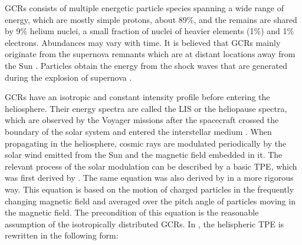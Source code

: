 \acp{GCR} consists of multiple energetic particle species spanning a wide range of energy, which are mostly simple protons, about 89\%, and the remains are shared by 9\% helium nuclei, a small fraction of nuclei of heavier elements (1\%) and 1\% electrons. Abundances may vary with time. %
It is believed that \acp{GCR} mainly originate from the supernova remnants which are at distant locations away from the Sun \citep{Blasi2013AARv2013,Bhattacarjee2000PhR,Fermi1949PhRv}. Particles obtain the energy from the shock waves that are generated during the explosion of supernova \citep{blandford1978particle}.


\acp{GCR} have an isotropic and constant intensity profile before entering the heliosphere. Their energy spectra are called the \ac{LIS} or the heliopause spectra, which are observed by the Voyager missions after the spacecraft crossed the boundary of the solar system and entered the interstellar medium \citep{Stone2013Sci, Cummings2016ApJ,Stone2019NatAs}.
When propagating in the heliosphere, cosmic rays are modulated periodically by the solar wind emitted from the Sun and the magnetic field embedded in it. The relevant process of the solar modulation can be described by a basic \ac{TPE}, which was first derived by \citet{Parker1965Pss}. The same equation was also derived by \citet{Gleeson1967ApJ} in a more rigorous way. This equation is based on the motion of charged particles in the frequently changing magnetic field and averaged over the pitch angle of particles moving in the magnetic field. The precondition of this equation is the reasonable assumption of the isotropically distributed \acp{GCR}. 
In \citet{Potgieter2013LRSP}, the helispheric \ac{TPE} is rewritten in the following form:

